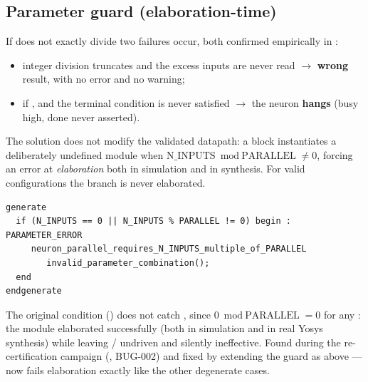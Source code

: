 \begin{center}
\end{center}

\subsection{Parameter guard (elaboration-time)}
If  does not exactly divide  two failures occur, both
confirmed empirically in :
\begin{itemize}
\item integer division truncates  and the excess inputs are never read
$\to$ \textbf{wrong} result, with no error and no warning;
\item if ,  and the terminal condition is
never satisfied $\to$ the neuron \textbf{hangs} (busy high, done never asserted).
\end{itemize}
The solution does not modify the validated datapath: a  block
instantiates a deliberately undefined module when
$\text{N\_INPUTS} \bmod \text{PARALLEL}\neq0$, forcing an error at \emph{elaboration}
both in simulation and in synthesis. For valid configurations the branch is never
elaborated.

\begin{lstlisting}[caption={\texttt{rtl/neuron\_parallel.v} --- parameter guard}]
generate
  if (N_INPUTS == 0 || N_INPUTS % PARALLEL != 0) begin : PARAMETER_ERROR
     neuron_parallel_requires_N_INPUTS_multiple_of_PARALLEL
        invalid_parameter_combination();
  end
endgenerate
\end{lstlisting}

\begin{fnnote}[Edge case \texttt{N\_INPUTS=0} (fixed 2026-09-04)]
The original condition () does not catch
, since $0 \bmod \text{PARALLEL}=0$ for any : the module
elaborated successfully (both in simulation and in real Yosys synthesis) while leaving
/ undriven and  silently ineffective. Found during
the re-certification campaign (, BUG-002) and fixed by
extending the guard as above ---  now fails elaboration exactly like the
other degenerate cases.
\end{fnnote}

